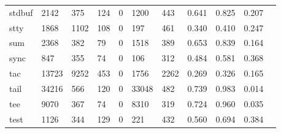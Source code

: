 \begin{longtable}{lp{1.10cm}p{1.10cm}p{1.10cm}p{1.10cm}p{1.10cm}p{1.10cm}p{1.10cm}p{1.10cm}p{1.10cm}p{1.10cm}}
stdbuf    &                   2142 &                                375 &                               124 &                                0 &                              1200 &                             443 &                             0.641 &                                 0.825 &                               0.207 \\
stty      &                   1868 &                               1102 &                               108 &                                0 &                               197 &                             461 &                             0.340 &                                 0.410 &                               0.247 \\
sum       &                   2368 &                                382 &                                79 &                                0 &                              1518 &                             389 &                             0.653 &                                 0.839 &                               0.164 \\
sync      &                    847 &                                355 &                                74 &                                0 &                               106 &                             312 &                             0.484 &                                 0.581 &                               0.368 \\
tac       &                  13723 &                               9252 &                               453 &                                0 &                              1756 &                            2262 &                             0.269 &                                 0.326 &                               0.165 \\
tail      &                  34216 &                                566 &                               120 &                                0 &                             33048 &                             482 &                             0.739 &                                 0.983 &                               0.014 \\
tee       &                   9070 &                                367 &                                74 &                                0 &                              8310 &                             319 &                             0.724 &                                 0.960 &                               0.035 \\
test      &                   1126 &                                344 &                               129 &                                0 &                               221 &                             432 &                             0.560 &                                 0.694 &                               0.384 \\

\end{longtable}
